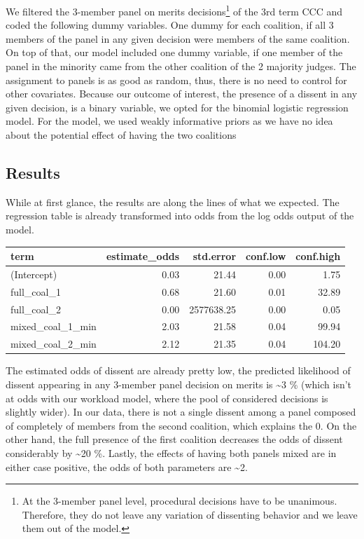 \documentclass[
  11pt,
]{article}
\begin{document}
We filtered the 3-member panel on merits decisions\footnote{At the
  3-member panel level, procedural decisions have to be unanimous.
  Therefore, they do not leave any variation of dissenting behavior and
  we leave them out of the model.} of the 3rd term CCC and coded the
following dummy variables. One dummy for each coalition, if all 3
members of the panel in any given decision were members of the same
coalition. On top of that, our model included one dummy variable, if one
member of the panel in the minority came from the other coalition of the
2 majority judges. The assignment to panels is as good as random, thus,
there is no need to control for other covariates. Because our outcome of
interest, the presence of a dissent in any given decision, is a binary
variable, we opted for the binomial logistic regression model. For the
model, we used weakly informative priors as we have no idea about the
potential effect of having the two coalitions

\hypertarget{results}{%
\subsection{Results}\label{results}}

While at first glance, the results are along the lines of what we
expected. The regression table is already transformed into odds from the
log odds output of the model.

\begin{longtable}[]{@{}lrrrr@{}}
\toprule\noalign{}
term & estimate\_odds & std.error & conf.low & conf.high \\
\midrule\noalign{}
\endhead
\bottomrule\noalign{}
\endlastfoot
(Intercept) & 0.03 & 21.44 & 0.00 & 1.75 \\
full\_coal\_1 & 0.68 & 21.60 & 0.01 & 32.89 \\
full\_coal\_2 & 0.00 & 2577638.25 & 0.00 & 0.05 \\
mixed\_coal\_1\_min & 2.03 & 21.58 & 0.04 & 99.94 \\
mixed\_coal\_2\_min & 2.12 & 21.35 & 0.04 & 104.20 \\
\end{longtable}

The estimated odds of dissent are already pretty low, the predicted
likelihood of dissent appearing in any 3-member panel decision on merits
is \textasciitilde3 \% (which isn't at odds with our workload model,
where the pool of considered decisions is slightly wider). In our data,
there is not a single dissent among a panel composed of completely of
members from the second coalition, which explains the 0. On the other
hand, the full presence of the first coalition decreases the odds of
dissent considerably by \textasciitilde20 \%. Lastly, the effects of
having both panels mixed are in either case positive, the odds of both
parameters are \textasciitilde2.
\end{document}
